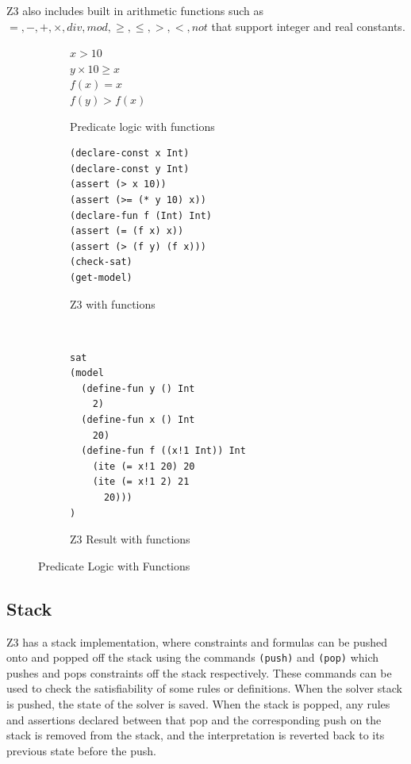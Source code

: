 \documentclass[a4paper]{report}
\begin{document}
Z3 also includes built in arithmetic functions such as $=, -, +, \times, div, mod, \geq, \leq, >, <, not$ that support integer and real constants. \\

\begin{figure}[!htb]
\centering
\begin{subfigure}[b]{\textwidth}
\centering
$x > 10$ \\
$y \times 10 \geq x$ \\
$f(x) = x$ \\
$f(y) > f(x)$
\caption{Predicate logic with functions}
\label{fig:Predicate logic with functions}
\end{subfigure}
\begin{subfigure}[b]{\textwidth}
\lstset{numbers=left, showspaces=false,
    showstringspaces=false, tabsize=2, breaklines=true,
    xleftmargin=5.0ex,
}
\centering
\begin{lstlisting}[frame=single]
(declare-const x Int)
(declare-const y Int)
(assert (> x 10))
(assert (>= (* y 10) x))
(declare-fun f (Int) Int)
(assert (= (f x) x))
(assert (> (f y) (f x)))
(check-sat)
(get-model)
\end{lstlisting}
\caption{Z3 with functions}
\label{fig:Z3 with functions}
\end{subfigure}\\
\begin{subfigure}[b]{\textwidth}
\begin{lstlisting}[frame=single]
sat
(model 
  (define-fun y () Int
    2)
  (define-fun x () Int
    20)
  (define-fun f ((x!1 Int)) Int
    (ite (= x!1 20) 20
    (ite (= x!1 2) 21
      20)))
)
\end{lstlisting}
\caption{Z3 Result with functions}
\label{fig:Z3 Function Result}
\end{subfigure}
\caption{Predicate Logic with Functions}
\label{fig:Predicate Logic with Functions}
\end{figure} 

\subsection{Stack}
Z3 has a stack implementation, where constraints and formulas can be pushed onto and popped off the stack using the commands \texttt{(push)} and \texttt{(pop)} which pushes and pops constraints off the stack respectively. These commands can be used to check the satisfiability of some rules or definitions. When the solver stack is pushed, the state of the solver is saved. When the stack is popped, any rules and assertions declared between that pop and the corresponding push on the stack is removed from the stack, and the interpretation is reverted back to its previous state before the push.\\
\end{document}
